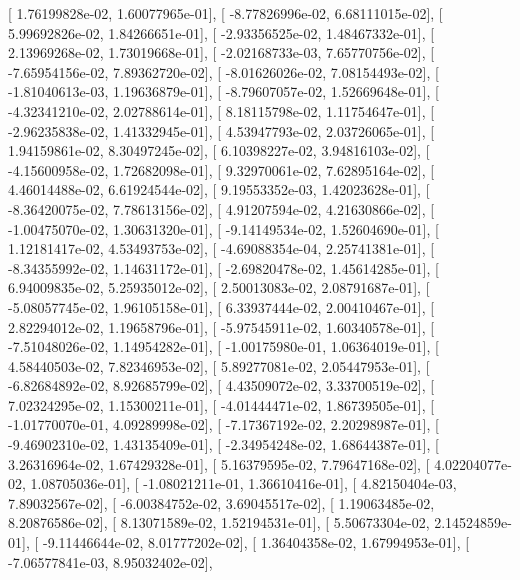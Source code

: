 \documentclass{article}
\begin{document}
       [  1.76199828e-02,   1.60077965e-01],
       [ -8.77826996e-02,   6.68111015e-02],
       [  5.99692826e-02,   1.84266651e-01],
       [ -2.93356525e-02,   1.48467332e-01],
       [  2.13969268e-02,   1.73019668e-01],
       [ -2.02168733e-03,   7.65770756e-02],
       [ -7.65954156e-02,   7.89362720e-02],
       [ -8.01626026e-02,   7.08154493e-02],
       [ -1.81040613e-03,   1.19636879e-01],
       [ -8.79607057e-02,   1.52669648e-01],
       [ -4.32341210e-02,   2.02788614e-01],
       [  8.18115798e-02,   1.11754647e-01],
       [ -2.96235838e-02,   1.41332945e-01],
       [  4.53947793e-02,   2.03726065e-01],
       [  1.94159861e-02,   8.30497245e-02],
       [  6.10398227e-02,   3.94816103e-02],
       [ -4.15600958e-02,   1.72682098e-01],
       [  9.32970061e-02,   7.62895164e-02],
       [  4.46014488e-02,   6.61924544e-02],
       [  9.19553352e-03,   1.42023628e-01],
       [ -8.36420075e-02,   7.78613156e-02],
       [  4.91207594e-02,   4.21630866e-02],
       [ -1.00475070e-02,   1.30631320e-01],
       [ -9.14149534e-02,   1.52604690e-01],
       [  1.12181417e-02,   4.53493753e-02],
       [ -4.69088354e-04,   2.25741381e-01],
       [ -8.34355992e-02,   1.14631172e-01],
       [ -2.69820478e-02,   1.45614285e-01],
       [  6.94009835e-02,   5.25935012e-02],
       [  2.50013083e-02,   2.08791687e-01],
       [ -5.08057745e-02,   1.96105158e-01],
       [  6.33937444e-02,   2.00410467e-01],
       [  2.82294012e-02,   1.19658796e-01],
       [ -5.97545911e-02,   1.60340578e-01],
       [ -7.51048026e-02,   1.14954282e-01],
       [ -1.00175980e-01,   1.06364019e-01],
       [  4.58440503e-02,   7.82346953e-02],
       [  5.89277081e-02,   2.05447953e-01],
       [ -6.82684892e-02,   8.92685799e-02],
       [  4.43509072e-02,   3.33700519e-02],
       [  7.02324295e-02,   1.15300211e-01],
       [ -4.01444471e-02,   1.86739505e-01],
       [ -1.01770070e-01,   4.09289998e-02],
       [ -7.17367192e-02,   2.20298987e-01],
       [ -9.46902310e-02,   1.43135409e-01],
       [ -2.34954248e-02,   1.68644387e-01],
       [  3.26316964e-02,   1.67429328e-01],
       [  5.16379595e-02,   7.79647168e-02],
       [  4.02204077e-02,   1.08705036e-01],
       [ -1.08021211e-01,   1.36610416e-01],
       [  4.82150404e-03,   7.89032567e-02],
       [ -6.00384752e-02,   3.69045517e-02],
       [  1.19063485e-02,   8.20876586e-02],
       [  8.13071589e-02,   1.52194531e-01],
       [  5.50673304e-02,   2.14524859e-01],
       [ -9.11446644e-02,   8.01777202e-02],
       [  1.36404358e-02,   1.67994953e-01],
       [ -7.06577841e-03,   8.95032402e-02],
\end{document}
